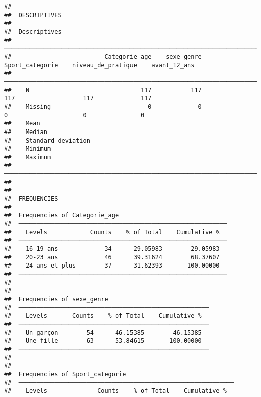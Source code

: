 \documentclass[
]{article}
\begin{document}
\begin{verbatim}
## 
##  DESCRIPTIVES
## 
##  Descriptives                                                                                                   
##  ────────────────────────────────────────────────────────────────────────────────────────────────────────────── 
##                          Categorie_age    sexe_genre    Sport_categorie    niveau_de_pratique    avant_12_ans   
##  ────────────────────────────────────────────────────────────────────────────────────────────────────────────── 
##    N                               117           117                117                   117             117   
##    Missing                           0             0                  0                     0               0   
##    Mean                                                                                                         
##    Median                                                                                                       
##    Standard deviation                                                                                           
##    Minimum                                                                                                      
##    Maximum                                                                                                      
##  ────────────────────────────────────────────────────────────────────────────────────────────────────────────── 
## 
## 
##  FREQUENCIES
## 
##  Frequencies of Categorie_age                               
##  ────────────────────────────────────────────────────────── 
##    Levels            Counts    % of Total    Cumulative %   
##  ────────────────────────────────────────────────────────── 
##    16-19 ans             34      29.05983        29.05983   
##    20-23 ans             46      39.31624        68.37607   
##    24 ans et plus        37      31.62393       100.00000   
##  ────────────────────────────────────────────────────────── 
## 
## 
##  Frequencies of sexe_genre                             
##  ───────────────────────────────────────────────────── 
##    Levels       Counts    % of Total    Cumulative %   
##  ───────────────────────────────────────────────────── 
##    Un garçon        54      46.15385        46.15385   
##    Une fille        63      53.84615       100.00000   
##  ───────────────────────────────────────────────────── 
## 
## 
##  Frequencies of Sport_categorie                               
##  ──────────────────────────────────────────────────────────── 
##    Levels              Counts    % of Total    Cumulative %   

\end{verbatim}
\end{document}
